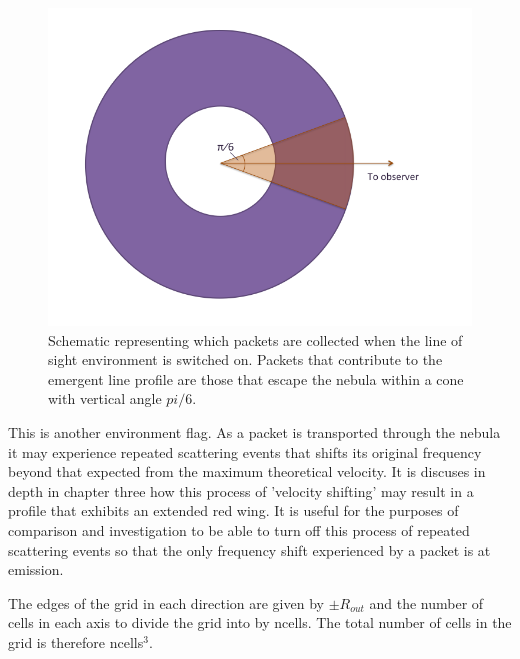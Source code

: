 \begin{centering}
\begin{figure}
\includegraphics[scale=0.55, trim=-25mm 10mm 29mm 0mm]{chapters/chapter2/LoS_diagram.png}
\caption{Schematic representing which packets are collected when the line of sight environment is switched on.  Packets that contribute to the emergent line profile are those that escape the nebula within a cone with vertical angle $pi/6$.}
\end{figure}
\end{centering}


  This is another environment flag.  As a packet is transported through the nebula it may experience repeated scattering events that shifts its original frequency beyond that expected from the maximum theoretical velocity.  It is discuses in depth in chapter three how this process of 'velocity shifting' may result in a profile that exhibits an extended red wing.  It is useful for the purposes of comparison and investigation to be able to turn off this process of repeated scattering events so that the only frequency shift experienced by a packet is at emission.




The edges of the grid in each direction are given by $\pm R_{out}$ and the number of cells in each axis to divide the grid into by ncells.  The total number of cells in the grid is therefore ncells$^3$.




